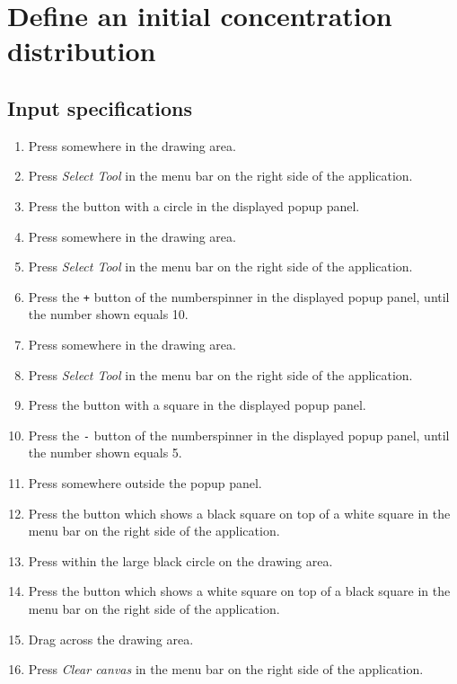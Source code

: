 \section{Define an initial concentration distribution}

\subsection*{Input specifications}
\begin{enumerate}
\item Press somewhere in the drawing area.
\item Press \emph{Select Tool} in the menu bar on the right side of the application.
\item Press the button with a circle in the displayed popup panel.
\item Press somewhere in the drawing area.
\item Press \emph{Select Tool} in the menu bar on the right side of the application.
\item Press the \texttt{+} button of the numberspinner in the displayed popup panel, until the number shown equals 10.
\item Press somewhere in the drawing area.
\item Press \emph{Select Tool} in the menu bar on the right side of the application. 
\item Press the button with a square in the displayed popup panel.
\item Press the \texttt{-} button of the numberspinner in the displayed popup panel, until the number shown equals 5.
\item Press somewhere outside the popup panel.
\item Press the button which shows a black square on top of a white square in the menu bar on the right side of the application. 
\item Press within the large black circle on the drawing area.
\item Press the button which shows a white square on top of a black square in the menu bar on the right side of the application. 
\item Drag across the drawing area.
\item Press \emph{Clear canvas} in the menu bar on the right side of the application. 
\end{enumerate}

